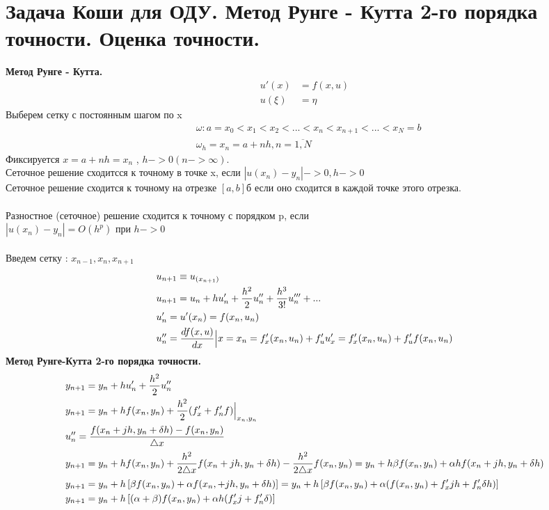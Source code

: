 \documentclass[12pt,a4paper]{article}
\begin{document}
	\section{Задача Коши для ОДУ. Метод Рунге - Кутта 2-го порядка точности. Оценка точности.}
	\textbf{Метод Рунге - Кутта.}
	\begin{align*}
	u'(x) &= f(x, u)\\
	u(\xi) &= \eta
	\end{align*}
	Выберем сетку  с постоянным шагом по x
	\begin{align*}
	&\omega: {a = x_0 < x_1 < x_2 < ... < x_n < x_{n+1} < ... < x_N = b}\\
	&\omega_h = {x_n = a + nh,  	n = \overline{1, N}}
	\end{align*}
	Фиксируется $x = a + nh = x_n$ , $h -> 0 (n -> \infty)$. \\
	Сеточное решение сходитсся к точному в точке x, если $ |u(x_n) - y_n| -> 0 , h -> 0$\\
	Сеточное решение сходится к точному на отрезке $[a, b]$б если оно сходится в каждой точке этого отрезка.\\\\
	Разностное (сеточное) решение сходится к точному с порядком p, если \\
	$|u(x_n) - y_n| = O(h^p) $ при $h -> 0$\\\\
	Введем сетку : $x_{n-1}, x_n, x_{n+1}$
	\begin{align*}
	&u_{n+1} \equiv  u_{(x_{n+1})}\\
	&u_{n+1} = u_n + hu'_n + \frac{h^2}{2}u''_n + \frac{h^3}{3!}u'''_n + ...\\
	&u'_n = u'(x_n) = f(x_n, u_n)\\
	&u''_n = \frac{df(x, u)}{dx} \Bigl|{x=x_n} = f'_x(x_n, u_n) + f'_u u'_x = f'_x(x_n, u_n) + f'_u f(x_n, u_n)
	\end{align*}
	\textbf{Метод Рунге-Кутта 2-го порядка точности.}\\
	\begin{align}
	&y_{n+1} = y_n + hu'_n + \frac{h^2}{2}u''_n\\
	&y_{n+1} = y_n + h f(x_n, y_n) + \frac{h^2}{2} (f'_x + f'_nf) \Bigl|_{x_n, y_n}\\
	&u''_n = \frac{f(x_n + j h, y_n + \delta h) - f(x_n, y_n)}{\triangle  x}\\
	&y_{n+1} = y_n + h f(x_n, y_n) + \frac{h^2}{2 \triangle x} f (x_n + j h, y_n + \delta h) - \frac{h^2}{2 \triangle x} f(x_n, y_n) = y_n + h \beta f(x_n, y_n) + \alpha h f(x_n + j h, y_n + \delta h)\\
	&y_{n+1} = y_n + h \left[ \beta f(x_n, y_n) + \alpha f(x_n, + j h, y_n + \delta h)  \right] = y_n + h \left[ \beta f (x_n, y_n) + \alpha (f(x_n, y_n) + f'_x j h + f'_n \delta h) \right] \\
	&y_{n+1} = y_n + h \left[ (\alpha + \beta) f(x_n , y_n) + \alpha h (f'_x j + f'_n \delta)\right]
	\end{align}\\
\end{document}
